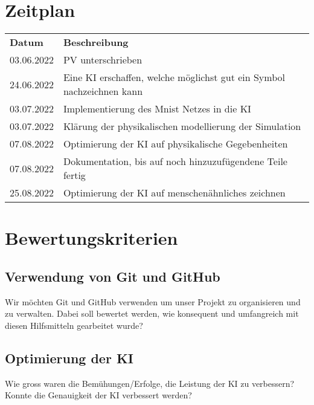 \documentclass{article}
\begin{document}
\section{Zeitplan}
\label{chap:zeitplan}
\begin{table}[H]
    \begin{tabular}{ll}
    \textbf{Datum} & \textbf{Beschreibung}                                                                         \\
    03.06.2022     & PV unterschrieben                                                                             \\
    24.06.2022     & Eine KI erschaffen, welche möglichst gut ein Symbol nachzeichnen kann                         \\
    03.07.2022     & Implementierung des Mnist Netzes in die KI                                                    \\
    03.07.2022     & Klärung der physikalischen modellierung der Simulation                                        \\
    07.08.2022     & Optimierung der KI auf physikalische Gegebenheiten                                            \\
    07.08.2022     & Dokumentation, bis auf noch hinzuzufügendene Teile fertig                                     \\
    25.08.2022     & Optimierung der KI auf menschenähnliches zeichnen                                             \\
    \end{tabular}
\end{table}

\section{Bewertungskriterien}
\subsection{Verwendung von Git und GitHub}
\label{chap:git_github}
Wir möchten Git und GitHub verwenden um unser Projekt zu organisieren und zu verwalten. 
Dabei soll bewertet werden, wie konsequent und umfangreich mit diesen Hilfsmitteln gearbeitet wurde?

\subsection{Optimierung der KI}
\label{chap:optimierung}
Wie gross waren die Bemühungen/Erfolge, die Leistung der KI zu verbessern?
Konnte die Genauigkeit der KI verbessert werden?
\end{document}
